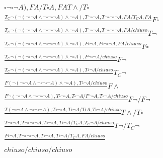 \documentclass[a4paper,12pt, oneside]{book}
\begin{document}
\begin{esempio}
{{\begin{gather*}
{    \square \neg  \square\neg A), FA/T\square A, FA}{}T\land/T\square\\
    \frac{T_C\neg(\neg(\neg\square\neg A\land \neg \square \neg
    \square\neg A)\land\neg\square A), T\neg\square\neg A,T \neg
    \square \neg  \square\neg A, FA/T_C A, FA}{}F\square\\
    \frac{T_C\neg(\neg(\neg\square\neg A\land \neg \square \neg
    \square\neg A)\land\neg\square A), T\neg\square\neg A,T \neg
    \square \neg  \square\neg A, FA/chiuso}{}T\neg\\
    \frac{T_C\neg(\neg(\neg\square\neg A\land \neg \square \neg
    \square\neg A)\land\neg\square A), F\square\neg A,F
    \square \neg  \square\neg A, FA/chiuso}{}F\square\\
    \frac{T_C\neg(\neg(\neg\square\neg A\land \neg \square \neg
    \square\neg A)\land\neg\square A),F\neg  \square\neg A/chiuso}{}F\neg\\
    \frac{T_C\neg(\neg(\neg\square\neg A\land \neg \square \neg
    \square\neg A)\land\neg\square A),T\square\neg A/chiuso}{}T_C\neg\\
    \frac{F(\neg(\neg\square\neg A\land \neg \square \neg
    \square\neg A)\land\neg\square A),T\square\neg A/chiuso}{}F\land\\
    \frac{F\neg(\neg\square\neg A\land \neg \square \neg
    \square\neg A), T\square\neg\square A,T\square\neg A/F\neg\square A,
    T\square\neg A/chiuso}{}F\neg/F\neg\\
    \frac{T(\neg\square\neg A\land \neg \square \neg
    \square\neg A), T\square\neg\square A,T\square\neg A/T\square A,
    T\square\neg A/chiuso}{}T\land/T\square\\
    \frac{T\neg\square\neg A,T\neg \square \neg
    \square\neg A, T\square\neg\square A,T\square\neg A/ T_C A,
    T_C\neg A/chiuso}{}T\neg/T_C\neg\\
    \frac{F\square\neg A,T\neg \square \neg
    \square\neg A, T\square\neg\square A,T\square\neg A/ T_C A,
    FA/chiuso}{}\\
    chiuso/chiuso/chiuso
  \end{gather*}
  }}
\end{esempio}
\end{document}
